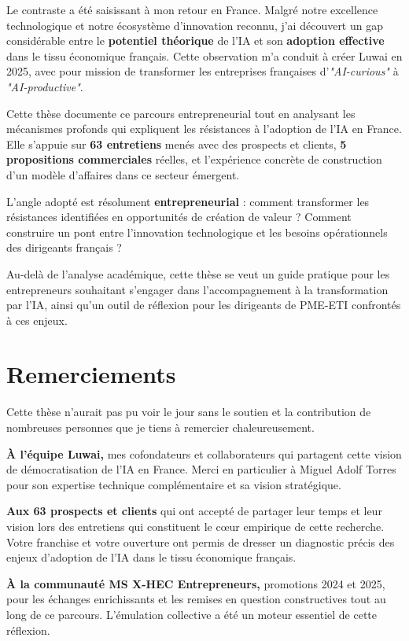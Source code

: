 \documentclass[12pt,a4paper]{report}
\begin{document}
Le contraste a été saisissant à mon retour en France. Malgré notre excellence technologique et notre écosystème d'innovation reconnu, j'ai découvert un gap considérable entre le \textbf{potentiel théorique} de l'IA et son \textbf{adoption effective} dans le tissu économique français. Cette observation m'a conduit à créer Luwai en 2025, avec pour mission de transformer les entreprises françaises d'\textit{"AI-curious"} à \textit{"AI-productive"}.

Cette thèse documente ce parcours entrepreneurial tout en analysant les mécanismes profonds qui expliquent les résistances à l'adoption de l'IA en France. Elle s'appuie sur \textbf{63 entretiens} menés avec des prospects et clients, \textbf{5 propositions commerciales} réelles, et l'expérience concrète de construction d'un modèle d'affaires dans ce secteur émergent.

L'angle adopté est résolument \textbf{entrepreneurial} : comment transformer les résistances identifiées en opportunités de création de valeur ? Comment construire un pont entre l'innovation technologique et les besoins opérationnels des dirigeants français ?

Au-delà de l'analyse académique, cette thèse se veut un guide pratique pour les entrepreneurs souhaitant s'engager dans l'accompagnement à la transformation par l'IA, ainsi qu'un outil de réflexion pour les dirigeants de PME-ETI confrontés à ces enjeux.

\chapter*{Remerciements}

Cette thèse n'aurait pas pu voir le jour sans le soutien et la contribution de nombreuses personnes que je tiens à remercier chaleureusement.

\textbf{À l'équipe Luwai,} mes cofondateurs et collaborateurs qui partagent cette vision de démocratisation de l'IA en France. Merci en particulier à Miguel Adolf Torres pour son expertise technique complémentaire et sa vision stratégique.

\textbf{Aux 63 prospects et clients} qui ont accepté de partager leur temps et leur vision lors des entretiens qui constituent le cœur empirique de cette recherche. Votre franchise et votre ouverture ont permis de dresser un diagnostic précis des enjeux d'adoption de l'IA dans le tissu économique français.

\textbf{À la communauté MS X-HEC Entrepreneurs,} promotions 2024 et 2025, pour les échanges enrichissants et les remises en question constructives tout au long de ce parcours. L'émulation collective a été un moteur essentiel de cette réflexion.
\end{document}
